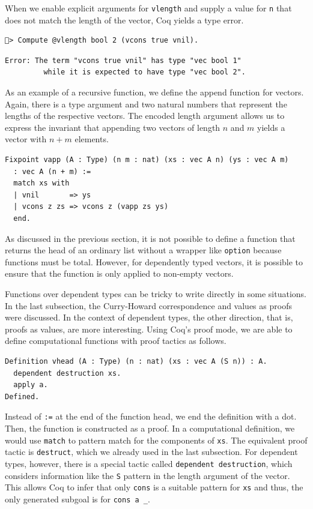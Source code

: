 \documentclass[a4paper, 11pt, fleqn, twoside, abstract=on]{scrreprt}
\newcommand{\cinl}[1]{\texttt{#1}}
\begin{document}
When we enable explicit arguments for \cinl{vlength} and supply a value for \cinl{n} that does not match the length of the vector, Coq yields a type error.

\begin{verbatim}
🐔> Compute @vlength bool 2 (vcons true vnil).
\end{verbatim}
\vspace*{-18pt}
\begin{verbatim}
Error: The term "vcons true vnil" has type "vec bool 1"
         while it is expected to have type "vec bool 2".
\end{verbatim}

As an example of a recursive function, we define the append function for vectors.
Again, there is a type argument and two natural numbers that represent the lengths of the respective vectors.
The encoded length argument allows us to express the invariant that appending two vectors of length $n$ and $m$ yields a vector with $n + m$ elements.

\begin{verbatim}
Fixpoint vapp (A : Type) (n m : nat) (xs : vec A n) (ys : vec A m) 
  : vec A (n + m) :=
  match xs with
  | vnil       => ys
  | vcons z zs => vcons z (vapp zs ys)
  end.
\end{verbatim}

As discussed in the previous section, it is not possible to define a function that returns the head of an ordinary list without a wrapper like \cinl{option} because functions must be total.
However, for dependently typed vectors, it is possible to ensure that the function is only applied to non-empty vectors.

Functions over dependent types can be tricky to write directly in some situations.
In the last subsection, the Curry-Howard correspondence and values as proofs were discussed.
In the context of dependent types, the other direction, that is, proofs as values, are more interesting.
Using Coq's proof mode, we are able to define computational functions with proof tactics as follows.

\begin{verbatim}
Definition vhead (A : Type) (n : nat) (xs : vec A (S n)) : A.
  dependent destruction xs.
  apply a.
Defined.
\end{verbatim}

Instead of \cinl{:=} at the end of the function head, we end the definition with a dot.
Then, the function is constructed as a proof.
In a computational definition, we would use \cinl{match} to pattern match for the components of \cinl{xs}.
The equivalent proof tactic is \cinl{destruct}, which we already used in the last subsection.
For dependent types, however, there is a special tactic called \cinl{dependent destruction}, which considers information like the \cinl{S} pattern in the length argument of the vector.
This allows Coq to infer that only \cinl{cons} is a suitable pattern for \cinl{xs} and thus, the only generated subgoal is for \cinl{cons a _}.
\end{document}
